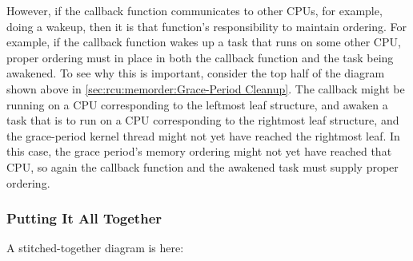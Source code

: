 However, if the callback function communicates to other CPUs, for
example, doing a wakeup, then it is that function's responsibility to
maintain ordering.
For example, if the callback function wakes up a task
that runs on some other CPU, proper ordering must in place in both the
callback function and the task being awakened.
To see why this is
important, consider the top half of the diagram shown above in
\cref{sec:rcu:memorder:Grace-Period Cleanup}.
The callback might be
running on a CPU corresponding to the leftmost leaf 
structure, and awaken a task that is to run on a CPU corresponding to
the rightmost leaf  structure, and the grace-period kernel
thread might not yet have reached the rightmost leaf.
In this case, the
grace period's memory ordering might not yet have reached that CPU, so
again the callback function and the awakened task must supply proper
ordering.

\subsubsection{Putting It All Together}
\label{sec:rcu:memorder:Putting It All Together}

A stitched-together diagram is here:

